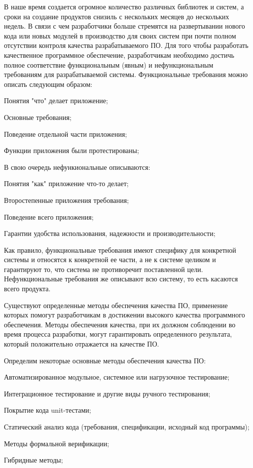\intro

В наше время создается огромное количество различных библиотек и систем, а сроки на создание продуктов снизиль с нескольких месяцев до нескольких недель.
В связи с чем разработчики больше стремятся на развертывании нового кода или новых модулей в производство для своих систем при почти полном отсутствии контроля качества разрабатываемого ПО.
Для того чтобы разработать качественное программное обеспечение, разработчикам необходимо достичь полное соответствие функциональным (явным) и нефункциональным требованиям для разрабатываемой системы.
Функциональные требования можно описать следующим образом:
%
\begin{itemize*}
\item Понятия "что" делает приложение;
\item Основные требования;
\item Поведение отдельной части приложения;
\item Функции приложения были протестированы;
\end{itemize*}
%

В свою очередь нефункиональные описываются:
%
\begin{itemize*}
\item Понятия "как" приложение что-то делает;
\item Второстепенные приложения требования;
\item Поведение всего приложения;
\item Гарантии удобства использования, надежности и производительности;
\end{itemize*}
%

Как правило, функциональные требования имеют специфику для конкретной системы и относятся к конкретной ее части, а не к системе целиком и гарантируют то, что система не противоречит поставленной цели.
Нефункциональные требования же описывают всю систему, то есть касаются всего продукта.

Существуют определенные методы обеспечения качества ПО, применение которых помогут разработчикам в достижении высокого качества программного обеспечения.
Методы обеспечения качества, при их должном соблюдении во время процесса разработки, могут гарантировать определенного результата, который положительно отражается на качестве ПО.

Определим некоторые основные методы обеспечения качества ПО:
%
\begin{itemize*}
\item Автоматизированное модульное, системное или нагрузочное тестирование;
\item Интеграционное тестирование и другие виды ручного тестирования;
\item Покрытие кода unit-тестами;
\item Статический анализ кода (требования, спецификации, исходный код программы);
\item Методы формальной верификации;
\item Гибридные методы;
\end{itemize*}
%

